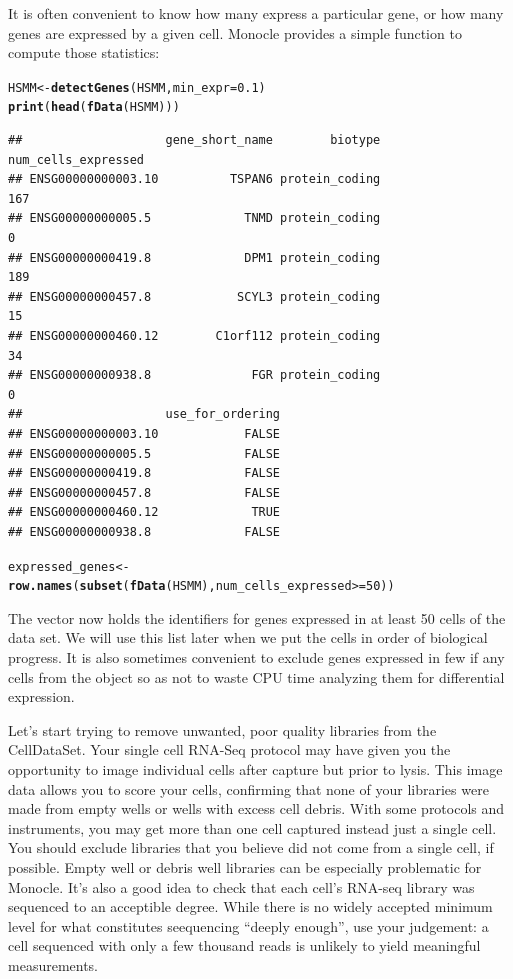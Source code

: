 \documentclass[10pt,oneside]{article}\usepackage[]{graphicx}\usepackage[]{color}
\makeatletter
\newcommand{\hlnum}[1]{\textcolor[rgb]{0.686,0.059,0.569}{#1}}%
\newcommand{\hlopt}[1]{\textcolor[rgb]{0,0,0}{#1}}%
\newcommand{\hlstd}[1]{\textcolor[rgb]{0.345,0.345,0.345}{#1}}%
\newcommand{\hlkwb}[1]{\textcolor[rgb]{0.69,0.353,0.396}{#1}}%
\newcommand{\hlkwc}[1]{\textcolor[rgb]{0.333,0.667,0.333}{#1}}%
\newcommand{\hlkwd}[1]{\textcolor[rgb]{0.737,0.353,0.396}{\textbf{#1}}}%
\newenvironment{kframe}{%
 \def\at@end@of@kframe{}%
 \ifinner\ifhmode%
  \def\at@end@of@kframe{\end{minipage}}%
  \begin{minipage}{\columnwidth}%
 \fi\fi%
 \def\FrameCommand##1{\hskip\@totalleftmargin \hskip-\fboxsep
 \colorbox{shadecolor}{##1}\hskip-\fboxsep
     \hskip-\linewidth \hskip-\@totalleftmargin \hskip\columnwidth}%
 \MakeFramed {\advance\hsize-\width
   \@totalleftmargin\z@ \linewidth\hsize
   \@setminipage}}%
 {\par\unskip\endMakeFramed%
 \at@end@of@kframe}
\newenvironment{knitrout}{}{} %
\makeatother
\begin{document}
It is often convenient to know how many express a particular gene, or how many genes are expressed by a given cell. Monocle provides a simple function to compute those statistics: 
\begin{knitrout}
\color{fgcolor}\begin{kframe}
\begin{alltt}
\hlstd{HSMM} \hlkwb{<-} \hlkwd{detectGenes}\hlstd{(HSMM,} \hlkwc{min_expr} \hlstd{=} \hlnum{0.1}\hlstd{)}
\hlkwd{print}\hlstd{(}\hlkwd{head}\hlstd{(}\hlkwd{fData}\hlstd{(HSMM)))}
\end{alltt}
\begin{verbatim}
##                    gene_short_name        biotype num_cells_expressed
## ENSG00000000003.10          TSPAN6 protein_coding                 167
## ENSG00000000005.5             TNMD protein_coding                   0
## ENSG00000000419.8             DPM1 protein_coding                 189
## ENSG00000000457.8            SCYL3 protein_coding                  15
## ENSG00000000460.12        C1orf112 protein_coding                  34
## ENSG00000000938.8              FGR protein_coding                   0
##                    use_for_ordering
## ENSG00000000003.10            FALSE
## ENSG00000000005.5             FALSE
## ENSG00000000419.8             FALSE
## ENSG00000000457.8             FALSE
## ENSG00000000460.12             TRUE
## ENSG00000000938.8             FALSE
\end{verbatim}
\begin{alltt}
\hlstd{expressed_genes} \hlkwb{<-} \hlkwd{row.names}\hlstd{(}\hlkwd{subset}\hlstd{(}\hlkwd{fData}\hlstd{(HSMM), num_cells_expressed} \hlopt{>=} \hlnum{50}\hlstd{))}
\end{alltt}
\end{kframe}
\end{knitrout}

The vector  now holds the identifiers for genes expressed in at least 50 cells of the data set. We will use this list later when we put the cells in order of biological progress. It is also sometimes convenient to exclude genes expressed in few if any cells from the  object so as not to waste CPU time analyzing them for differential expression.

Let's start trying to remove unwanted, poor quality libraries from the CellDataSet. Your single cell RNA-Seq protocol may have given you the opportunity to image individual cells after capture but prior to lysis. This image data allows you to score your cells, confirming that none of your libraries were made from empty wells or wells with excess cell debris.  With some protocols and instruments, you may get more than one cell captured instead just a single cell. You should exclude libraries that you believe did not come from a single cell, if possible. Empty well or debris well libraries can be especially problematic for Monocle. It's also a good idea to check that each cell's RNA-seq library was sequenced to an acceptible degree.  While there is no widely accepted minimum level for what constitutes seequencing ``deeply enough'', use your judgement: a cell sequenced with only a few thousand reads is unlikely to yield meaningful measurements.   
\end{document}
